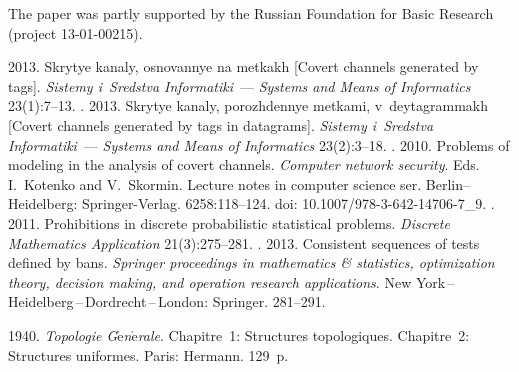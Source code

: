 

\Ack
\noindent
The paper was partly supported by the Russian Foundation
for Basic Research  (project 13-01-00215).


  \begin{multicols}{2}

\renewcommand{\bibname}{\protect\rmfamily References}



{\small\frenchspacing
 {%
 \begin{thebibliography}{9}
 2013. Skrytye kanaly, osnovannye na metkakh
[Covert channels generated by tags].  \textit{Sistemy i~Sredstva Informatiki}~---
\textit{Systems and Means of Informatics} 23(1):7--13.
.  2013.
Skrytye kanaly, porozhdennye metkami, v~deytagrammakh [Covert channels
generated by tags in datagrams]. \textit{Sistemy i~Sredstva Informatiki}~---
\textit{Systems and Means of Informatics} 23(2):3--18.
. 2010. Problems of modeling
in the analysis of covert channels.
\textit{Computer network security}. Eds. I.~Kotenko and V.~Skormin.
Lecture notes in computer science ser.
Berlin--Heidelberg: Springer-Verlag. 6258:118--124.
doi: 10.1007/978-3-642-14706-7\_9.
. 2011. Prohibitions in discrete
probabilistic statistical problems.
\textit{Discrete Mathematics Application} 21(3):275--281.
. 2013. Consistent sequences
of tests defined by bans.
\textit{Springer proceedings in mathematics \& statistics, optimization theory,
decision making, and operation research applications}.
New York\,--\,Heidelberg\,--\,Dordrecht\,--\,London: Springer. 281--291.

\smallskip

1940. \textit{Topologie G$\acute{\mbox{e}}$n$\acute{\mbox{e}}$rale}.
Chapitre~1: Structures topologiques. Chapitre~2: Structures uniformes.
Paris: Hermann. 129~p.


\end{thebibliography}}}
\end{multicols}
